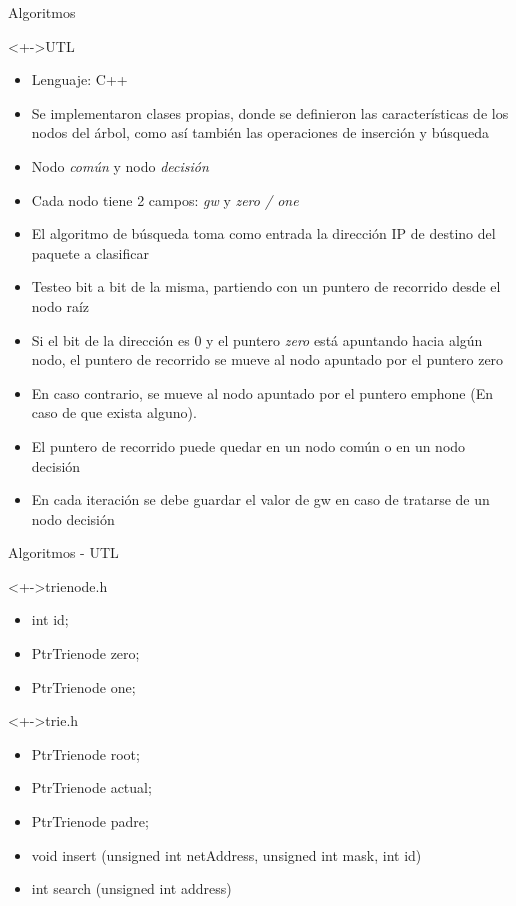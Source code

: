 \documentclass[xcolor=dvipsnames]{beamer}
\begin{document}
\begin{frame}{Algoritmos}
\begin{block}<+->{UTL}   
    \begin{itemize}
      \scriptsize
     	\item Lenguaje: C++
     	\item Se implementaron clases propias, donde se definieron las características de los nodos del árbol, como así también las operaciones de inserción y búsqueda
     	\item Nodo \emph{común} y nodo \emph{decisión}
	\item Cada nodo tiene 2 campos: \emph{gw} y \emph{zero / one}
	\item El algoritmo de búsqueda toma como entrada la dirección IP de destino del paquete a clasificar
	\item Testeo bit a bit de la misma, partiendo con un puntero de recorrido desde el nodo raíz
	\item Si el bit de la dirección es 0 y el puntero \emph{zero} está apuntando hacia algún nodo, el puntero de recorrido se mueve al nodo apuntado por el puntero zero
	\item En caso contrario, se mueve al nodo apuntado por el puntero emph{one} (En caso de que exista alguno).
	\item El puntero de recorrido puede quedar en un nodo común o en un nodo decisión
	\item En cada iteración se debe guardar el valor de gw en caso de tratarse de un nodo decisión
    \end{itemize}
  \end{block}
\end{frame}

\begin{frame}{Algoritmos - UTL}
\begin{block}<+->{trienode.h}   
    \begin{itemize}
      \scriptsize
     	\item int id;
     	\item PtrTrienode zero;
     	\item PtrTrienode one;
    \end{itemize}
  \end{block}

\begin{block}<+->{trie.h}   
    \begin{itemize}
      \scriptsize
     	\item PtrTrienode root;
	\item PtrTrienode actual;
	\item PtrTrienode padre;
	\item void insert (unsigned int netAddress, unsigned int mask, int id)
	\item int search (unsigned int address)
    \end{itemize}
  \end{block}
\end{frame}	
\end{document}
